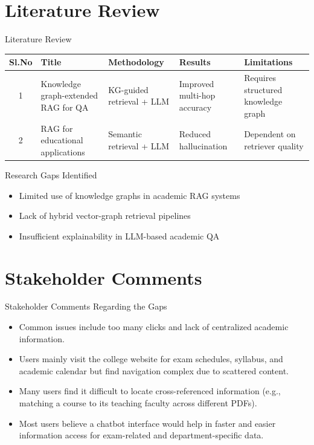 \documentclass[10pt,aspectratio=1610]{beamer}
\begin{document}
\section{Literature Review}
\begin{frame}{Literature Review}
\scriptsize
\begin{tabularx}{\textwidth}{|c|X|X|X|X|}
\hline
Sl.No & Title & Methodology & Results & Limitations\\
\hline
1 & Knowledge graph-extended RAG for QA \cite{kg_rag_springer} 
  & KG-guided retrieval + LLM 
  & Improved multi-hop accuracy 
  & Requires structured knowledge graph\\
\hline
2 & RAG for educational applications \cite{rag_edu_elsevier} 
  & Semantic retrieval + LLM 
  & Reduced hallucination 
  & Dependent on retriever quality\\
\hline
\end{tabularx}
\end{frame}

\begin{frame}{Research Gaps Identified}
\begin{itemize}
\item Limited use of knowledge graphs in academic RAG systems
\item Lack of hybrid vector-graph retrieval pipelines
\item Insufficient explainability in LLM-based academic QA
\end{itemize}
\end{frame}



\section{Stakeholder Comments}
\begin{frame}{Stakeholder Comments Regarding the Gaps}
\begin{itemize}
    \item Common issues include too many clicks and lack of centralized academic information.
    \item Users mainly visit the college website for exam schedules, syllabus, and academic calendar but find navigation complex due to scattered content.
    \item Many users find it difficult to locate cross-referenced information (e.g., matching a course to its teaching faculty across different PDFs).
    \item Most users believe a chatbot interface would help in faster and easier information access for exam-related and department-specific data.
\end{itemize}
\end{frame}
\end{document}
